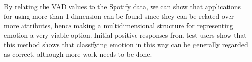 
By relating the VAD values to the Spotify data, we can show that applications for using more than 1 dimension can be found since they can be related over more attributes, hence making a multidimensional structure for representing emotion a very viable option. Initial positive responses from test users show that this method shows that classifying emotion in this way can be generally regarded as correct, although more work needs to be done.

